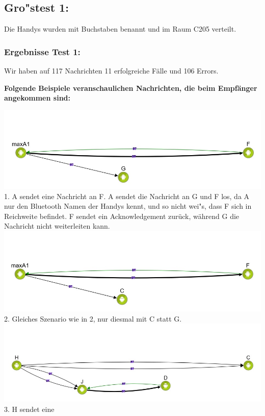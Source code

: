 \subsection{Gro"stest 1:}\label{grosstest-1}

Die Handys wurden mit Buchstaben benannt und im Raum C205 verteilt.

\subsubsection{Ergebnisse Test 1:}\label{ergebnisse-test-1}

Wir haben auf 117 Nachrichten 11 erfolgreiche Fälle und 106 Errors.

\textbf{Folgende Beispiele veranschaulichen Nachrichten, die beim
Empfänger angekommen sind:}

\includegraphics[width=1.0\textwidth]{belege/grosstests/Bilder/Erfolg4.jpg}
1. A sendet eine Nachricht an F. A sendet die Nachricht an G und F los, da A nur den
Bluetooth Namen der Handys kennt, und so nicht wei"s, dass F sich in
Reichweite befindet. F sendet ein Acknowledgement zurück, während G die
Nachricht nicht weiterleiten kann.
\includegraphics[width=1.0\textwidth]{belege/grosstests/Bilder/Erfolg3.jpg}
2. Gleiches Szenario wie in 2, nur diesmal mit C statt G.
\includegraphics[width=1.0\textwidth]{belege/grosstests/Bilder/Erfolg2.jpg} 3. H sendet eine
